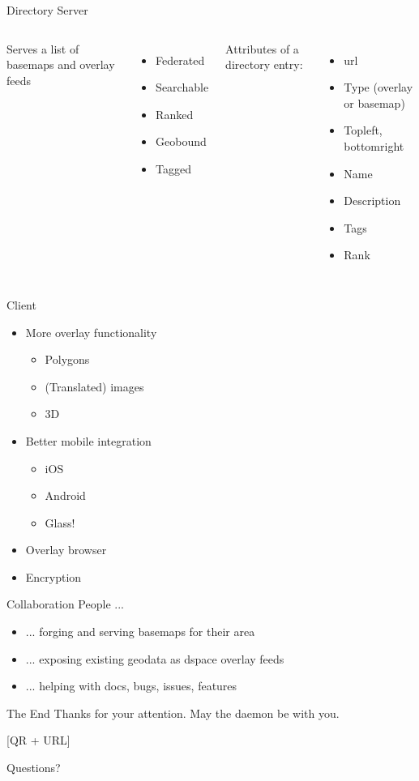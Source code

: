 \documentclass{beamer}
\begin{document}
\begin{frame}{Directory Server}
 \vspace{0.8em}
 \begin{columns}
   Serves a list of basemaps and overlay feeds
    \begin{itemize}
    \item Federated
    \item Searchable
    \item Ranked
    \item Geobound
    \item Tagged
    \end{itemize}
   Attributes of a directory entry:
    \begin{itemize}
    \item url
    \item Type (overlay or basemap)
    \item Topleft, bottomright
    \item Name
    \item Description
    \item Tags
    \item Rank
    \end{itemize}
 \end{columns}
\end{frame}

\begin{frame}{Client}
\begin{itemize}
\item More overlay functionality
    \begin{itemize}
    \item Polygons
    \item (Translated) images
    \item 3D
    \end{itemize}
\item Better mobile integration
    \begin{itemize}
    \item iOS
    \item Android
    \item Glass!
    \end{itemize}
\item Overlay browser
\item Encryption
\end{itemize}
\end{frame}

\begin{frame}{Collaboration}
People ...
\begin{itemize}
\item ... forging and serving basemaps for their area
\item ... exposing existing geodata as dspace overlay feeds
\item ... helping with docs, bugs, issues, features
\end{itemize}
\end{frame}


\begin{frame}{The End}
 Thanks for your attention. May the daemon be with you.

 [QR + URL]

 Questions?
\end{frame}
\end{document}
